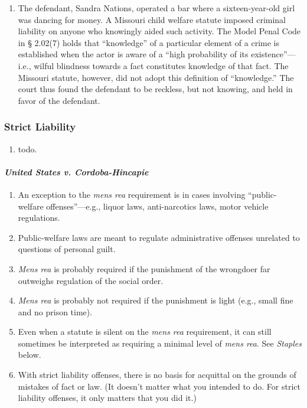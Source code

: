 \begin{enumerate}
    \item The defendant, Sandra Nations, operated a bar where a sixteen-year-old girl was dancing for money. A Missouri child welfare statute imposed criminal liability on anyone who knowingly aided such activity. The Model Penal Code in § 2.02(7) holds that ``knowledge'' of a particular element of a crime is established when the actor is aware of a ``high probability of its existence''---i.e., wilful blindness towards a fact constitutes knowledge of that fact. The Missouri statute, however, did not adopt this definition of ``knowledge.'' The court thus found the defendant to be reckless, but not knowing, and held in favor of the defendant.
\end{enumerate}

\subsubsection{Strict Liability}

\begin{enumerate}
    \item todo.
\end{enumerate}

\paragraph{\emph{United States v. Cordoba-Hincapie}}

\begin{enumerate}
    \item An exception to the \emph{mens rea} requirement is in cases involving ``public-welfare offenses''---e.g., liquor laws, anti-narcotics laws, motor vehicle regulations.
    \item Public-welfare laws are meant to regulate administrative offenses unrelated to questions of personal guilt.
    \item \emph{Mens rea} is probably required if the punishment of the wrongdoer far outweighs regulation of the social order.
    \item \emph{Mens rea} is probably not required if the punishment is light (e.g., small fine and no prison time).
    \item Even when a statute is silent on the \emph{mens rea} requirement, it can still sometimes be interpreted as requiring a minimal level of \emph{mens rea}. See \emph{Staples} below.
    \item With strict liability offenses, there is no basis for acquittal on the grounds of mistakes of fact or law. (It doesn't matter what you intended to do. For strict liability offenses, it only matters that you did it.)
\end{enumerate}

